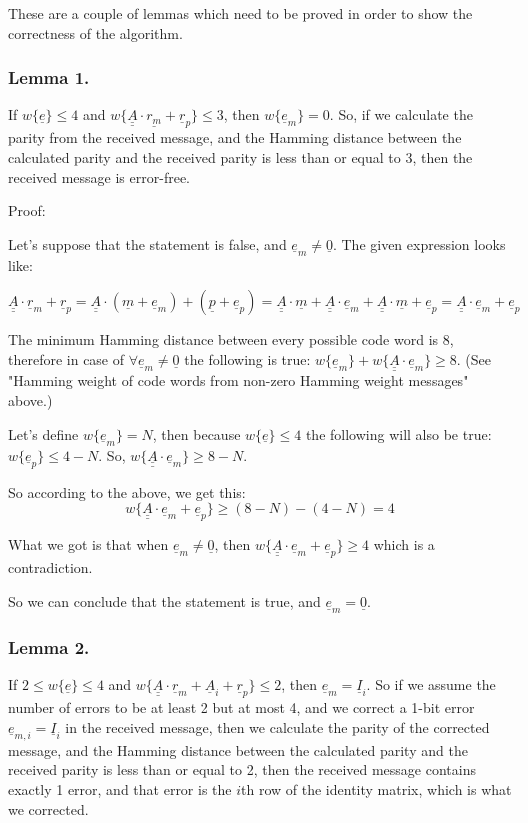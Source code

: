 \documentclass[11pt,a4paper,oneside]{report}             %
\def\doubleunderline#1{\underline{\underline{#1}}}
\def\dul#1{\doubleunderline{#1}}
\def\ul#1{\underline{#1}}
\begin{document}
These are a couple of lemmas which need to be proved in order to show the correctness of the algorithm.

\subsubsection{Lemma 1.}

If $w\{\ul{e}\} \leq 4$ and $w\{\dul{A} \cdot \ul {r_m} + \ul{r}_p\} \leq 3$,
then $w\{\ul{e}_m\} = 0$. So, if we calculate the parity from the received message, and
the Hamming distance between the calculated parity and the received parity is less than
or equal to 3, then the received message is error-free.

Proof:

Let's suppose that the statement is false, and $\ul{e}_m \neq \ul{0}$.
The given expression looks like:

\[
    \dul{A} \cdot \ul{r}_m + \ul{r}_p =
    \dul{A} \cdot ( \ul{m} + \ul{e}_m ) + ( \ul{p} + \ul{e}_p ) =
    \dul{A} \cdot \ul{m} + \dul{A} \cdot \ul{e}_m + \dul{A} \cdot \ul{m} + \ul{e}_p =
    \dul{A} \cdot \ul{e}_m + \ul{e}_p
\]

The minimum Hamming distance between every possible code word is 8, therefore
in case of $\forall \ul{e}_m \neq \ul{0}$ the following is true:
$w\{ \ul{e}_m \} +  w\{ \dul{A} \cdot \ul{e}_m \} \geq 8$.
(See "Hamming weight of code words from non-zero Hamming weight messages" above.)

Let's define $w\{ \ul{e}_m \} = N$, then because $w\{ \ul{e} \} \leq 4$ the following
will also be true: $w\{ \ul{e}_p \} \leq 4 - N$.
So, $w\{ \dul{A} \cdot \ul{e}_m \} \geq 8 - N$.

So according to the above, we get this:
\[
    w\{ \dul{A} \cdot \ul{e}_m + \ul{e}_p \} \geq (8 - N) - (4 - N) = 4
\]

What we got is that when $\ul{e}_m \neq \ul{0}$, then
$w\{ \dul{A} \cdot \ul{e}_m + \ul{e}_p \} \geq 4$ which is a contradiction.

So we can conclude that the statement is true, and $\ul{e}_m = \ul{0}$.

\subsubsection{Lemma 2.}

If $2 \leq w\{\ul{e}\} \leq 4$ and $w\{\dul{A} \cdot \ul{r}_m + \ul{A}_i + \ul{r}_p\} \leq 2$,
then $\ul{e}_m = \ul{I}_i$. So if we assume the number of errors to be at least 2 but at most 4,
and we correct a 1-bit error $\ul{e}_{m, i} = \ul{I}_i$ in the received message, then we calculate
the parity of the corrected message, and the Hamming distance between the calculated parity and
the received parity is less than or equal to 2, then the received message contains exactly 1 error,
and that error is the $i$th row of the identity matrix, which is what we corrected.
\end{document}
